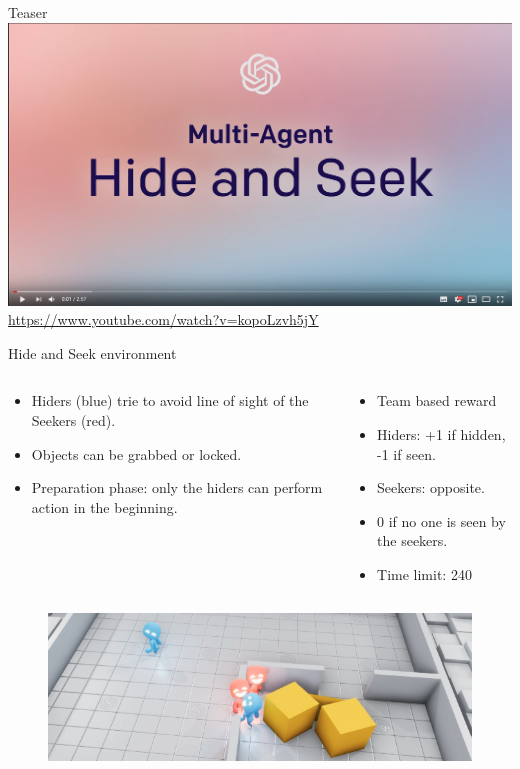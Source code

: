 \documentclass{beamer}
\begin{document}
\begin{frame}{Teaser}
\centering
\includegraphics[scale=0.25]{teaser.png}
\url{https://www.youtube.com/watch?v=kopoLzvh5jY}
\end{frame}{}
\begin{frame}{Hide and Seek environment}

\begin{columns}
\begin{column}{0.5\textwidth}
\begin{itemize}
        \item Hiders (blue) trie to avoid line of sight of the Seekers (red).
        \item Objects can be grabbed or locked.
        \item Preparation phase: only the hiders can perform action in the beginning.
    \end{itemize}{}
\end{column}
\begin{column}{0.5\textwidth}  %
    \begin{itemize}
        \item Team based reward
        \item Hiders: +1 if hidden, -1 if seen.
        \item Seekers: opposite.
        \item 0 if no one is seen by the seekers.
        \item Time limit: 240
    \end{itemize}{}
\end{column}
\end{columns}
\begin{figure}
\includegraphics[scale=0.4]{hasenv.png}
\end{figure}
\end{frame}{}
\end{document}
